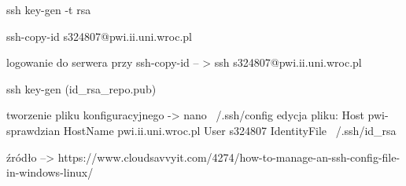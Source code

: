 ssh key-gen -t rsa

ssh-copy-id s324807@pwi.ii.uni.wroc.pl

logowanie do serwera przy ssh-copy-id -- > ssh s324807@pwi.ii.uni.wroc.pl

ssh key-gen (id_rsa_repo.pub)

tworzenie pliku konfiguracyjnego -> nano ~/.ssh/config
edycja pliku:
 Host pwi-sprawdzian
  HostName pwi.ii.uni.wroc.pl
  User s324807
  IdentityFile ~/.ssh/id_rsa
  
 źródło --> https://www.cloudsavvyit.com/4274/how-to-manage-an-ssh-config-file-in-windows-linux/
 
 


